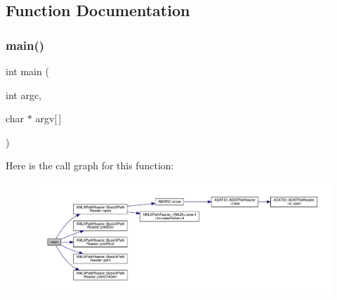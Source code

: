 \subsection{Function Documentation}
\mbox{\label{adat-devel_2other__libs_2xpath__reader_2examples_2basic__xpath__reader__test3_8cc_a0ddf1224851353fc92bfbff6f499fa97}} 
\subsubsection{\texorpdfstring{main()}{main()}}
{\footnotesize\ttfamily int main (\begin{DoxyParamCaption}\item[{int}]{argc,  }\item[{char $\ast$}]{argv\mbox{[}$\,$\mbox{]} }\end{DoxyParamCaption})}

Here is the call graph for this function\+:
\nopagebreak
\begin{figure}[H]
\begin{center}
\leavevmode
\includegraphics[width=350pt]{d2/df3/adat-devel_2other__libs_2xpath__reader_2examples_2basic__xpath__reader__test3_8cc_a0ddf1224851353fc92bfbff6f499fa97_cgraph}
\end{center}
\end{figure}

